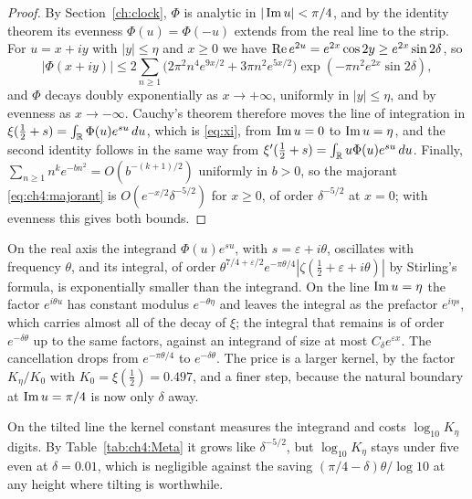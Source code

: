 \begin{proof}
By Section~\ref{ch:clock}, $\Phi$ is analytic in $|\operatorname{Im} u|<\pi/4$, and by the identity theorem its evenness $\Phi(u)=\Phi(-u)$ extends from the real line to the strip. For $u=x+iy$ with $|y|\le\eta$ and $x\ge0$ we have $\operatorname{Re} e^{2u}=e^{2x}\cos2y\ge e^{2x}\sin2\delta$, so
\begin{equation}\label{eq:ch4:majorant}
|\Phi(x+iy)|\le2\sum_{n\ge1}\big(2\pi^2n^4e^{9x/2}+3\pi n^2e^{5x/2}\big)\exp(-\pi n^2e^{2x}\sin2\delta),
\end{equation}
and $\Phi$ decays doubly exponentially as $x\to+\infty$, uniformly in $|y|\le\eta$, and by evenness as $x\to-\infty$. Cauchy's theorem therefore moves the line of integration in $\xi(\tfrac12+s)=\int_{\mathbb{R}}\Phi(u)e^{su}\,du$, which is \eqref{eq:xi}, from $\operatorname{Im} u=0$ to $\operatorname{Im} u=\eta$, and the second identity follows in the same way from $\xi'(\tfrac12+s)=\int_{\mathbb{R}}u\Phi(u)e^{su}\,du$. Finally, $\sum_{n\ge1}n^ke^{-bn^2}=O(b^{-(k+1)/2})$ uniformly in $b>0$, so the majorant \eqref{eq:ch4:majorant} is $O(e^{-x/2}\delta^{-5/2})$ for $x\ge0$, of order $\delta^{-5/2}$ at $x=0$; with evenness this gives both bounds.
\end{proof}

On the real axis the integrand $\Phi(u)e^{su}$, with $s=\varepsilon+i\theta$, oscillates with frequency $\theta$, and its integral, of order $\theta^{7/4+\varepsilon/2}e^{-\pi\theta/4}|\zeta(\tfrac12+\varepsilon+i\theta)|$ by Stirling's formula, is exponentially smaller than the integrand. On the line $\operatorname{Im} u=\eta$ the factor $e^{i\theta u}$ has constant modulus $e^{-\theta\eta}$ and leaves the integral as the prefactor $e^{i\eta s}$, which carries almost all of the decay of $\xi$; the integral that remains is of order $e^{-\delta\theta}$ up to the same factors, against an integrand of size at most $C_\delta e^{\varepsilon x}$. The cancellation drops from $e^{-\pi\theta/4}$ to $e^{-\delta\theta}$. The price is a larger kernel, by the factor $K_\eta/K_0$ with $K_0=\xi(\tfrac12)=0.497$, and a finer step, because the natural boundary at $\operatorname{Im} u=\pi/4$ \cite[Chapter 11, Section 1.4, and Chapter 5, Section 3.2]{Remmert98} is now only $\delta$ away.

On the tilted line the kernel constant measures the integrand and costs $\log_{10}K_\eta$ digits. By Table~\ref{tab:ch4:Meta} it grows like $\delta^{-5/2}$, but $\log_{10}K_\eta$ stays under five even at $\delta=0.01$, which is negligible against the saving $(\pi/4-\delta)\theta/\log10$ at any height where tilting is worthwhile.


